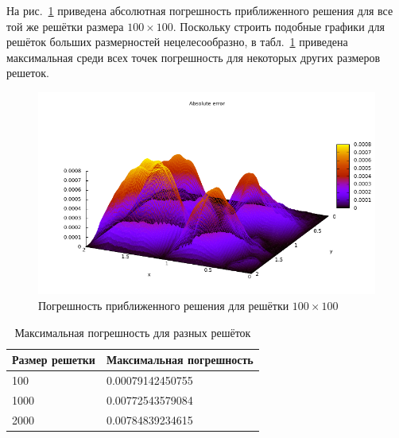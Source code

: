 \documentclass[12pt,notitlepage,oneside]{extarticle}
\begin{document}
На рис.~\ref{err:image} приведена абсолютная погрешность приближенного решения
для все той же решётки размера $100 \times 100$. Поскольку строить подобные
графики для решёток больших размерностей нецелесообразно, в табл.~\ref{err:table}
приведена максимальная среди всех точек погрешность для некоторых других размеров
решеток.

\begin{figure}[h]
  \centering
  \includegraphics[scale=1.3]{abs_error.pdf}
  \caption{Погрешность приближенного решения для решётки $100 \times 100$}
  \label{err:image}
\end{figure}


\begin{table}[h]
  \centering
  \caption{Максимальная погрешность для разных решёток}
  \label{err:table}
  \begin{tabular}{|l|l|}
    \hline
    \textbf{Размер решетки}    & \textbf{Максимальная погрешность} \\ \hline
    100  & 0.00079142450755                  \\ \hline
    1000                       & 0.00772543579084                  \\ \hline
    2000 & 0.00784839234615                  \\ \hline
  \end{tabular}
\end{table}
\end{document}
